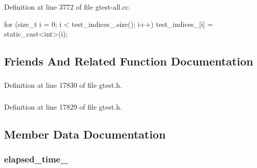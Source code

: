 \-Definition at line 3772 of file gtest-\/all.\-cc.


\begin{DoxyCode}
                              {
  for (size_t i = 0; i < test_indices_.size(); i++) {
    test_indices_[i] = static_cast<int>(i);
  }
}
\end{DoxyCode}


\subsection{\-Friends \-And \-Related \-Function \-Documentation}
\hypertarget{classtesting_1_1TestCase_aa684cc13a8f91b00c0c9ce41ec7474eb}{
\subsubsection[{internal\-::\-Unit\-Test\-Impl}]{}}\label{d0/d9a/classtesting_1_1TestCase_aa684cc13a8f91b00c0c9ce41ec7474eb}


\-Definition at line 17830 of file gtest.\-h.

\hypertarget{classtesting_1_1TestCase_ab085d1bf4cff8b1045750706b11f8662}{
\subsubsection[{\-Test}]{}}\label{d0/d9a/classtesting_1_1TestCase_ab085d1bf4cff8b1045750706b11f8662}


\-Definition at line 17829 of file gtest.\-h.



\subsection{\-Member \-Data \-Documentation}
\hypertarget{classtesting_1_1TestCase_a97b9c166ebee95ae4c9ef26cf3155617}{
\subsubsection[{elapsed\-\_\-time\-\_\-}]{ {\bf elapsed\-\_\-time\-\_\-}}}\label{d0/d9a/classtesting_1_1TestCase_a97b9c166ebee95ae4c9ef26cf3155617}


